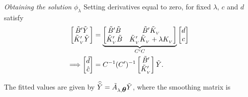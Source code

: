 \begin{frame}{\textit{Obtaining the solution}  $\phi_\lambda$}
\footnotesize
Setting derivatives equal to zero, for fixed $\lambda$, $c$ and $d$ satisfy
\begin{align*}%
\begin{bmatrix}
\tildeB'\tildeY \\
 \tildeK_{_{ V}}'\tildeY\\
\end{bmatrix} &= \underbrace{\begin{bmatrix}
\tildeB'\tildeB & \tildeB'\tildeK_{_{ V}} \\
\tildeK_{_{ V}}'\tildeB & \tildeK_{_{ V}}'\tildeK_{_{ V}} + \lambda K_{_{ V}}\\
\end{bmatrix}}_{C'C}
\begin{bmatrix}
d\\
c\\
\end{bmatrix}
\\
\Longrightarrow \begin{bmatrix} \hat{d} \\ \hat{c} \end{bmatrix} &=  {C}^{-1} ({C}')^{-1} \begin{bmatrix} \tildeB' \\ \tildeK_{_{ V}}' \end{bmatrix} \tildeY. 
\end{align*}

The fitted values are given by $\widehat{\tilde{Y}} =  \tilde{A}_{\lambda,\mbox{\boldmath $\theta$}} \tilde{Y}$, where the smoothing matrix is

\end{frame}



